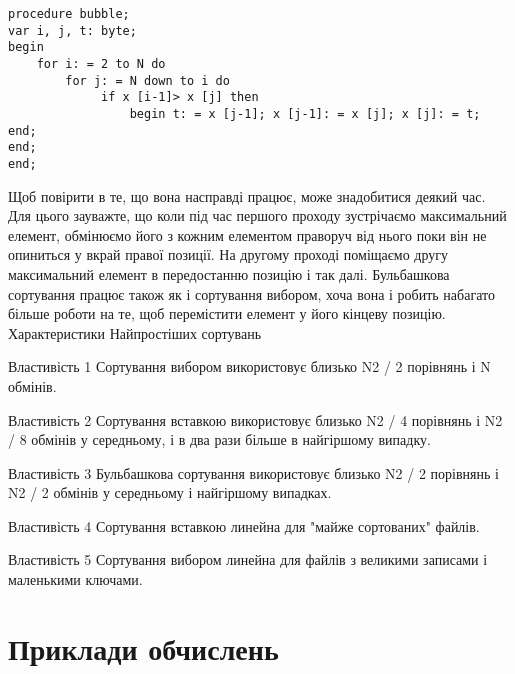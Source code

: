 \begin{lstlisting}[label=code:bubble,caption=Бульбашкове сортування]
procedure bubble;
var i, j, t: byte;
begin
    for i: = 2 to N do
        for j: = N down to i do
             if x [i-1]> x [j] then
                 begin t: = x [j-1]; x [j-1]: = x [j]; x [j]: = t; end;
end;
end;
\end{lstlisting}

Щоб повірити в те, що вона насправді працює, може знадобитися деякий час. Для цього зауважте, що коли під час першого проходу зустрічаємо максимальний елемент, обмінюємо його з кожним елементом праворуч від нього поки він не опиниться у вкрай правої позиції. На другому проході поміщаємо другу максимальний елемент в передостанню позицію і так далі. Бульбашкова сортування працює також як і сортування вибором, хоча вона і робить набагато більше роботи на те, щоб перемістити елемент у його кінцеву позицію.
Характеристики Найпростіших сортувань

Властивість 1 Сортування вибором використовує близько N2 / 2 порівнянь і N обмінів.

Властивість 2 Сортування вставкою використовує близько N2 / 4 порівнянь і N2 / 8 обмінів у середньому, і в два рази більше в найгіршому випадку.

Властивість 3 Бульбашкова сортування використовує близько N2 / 2 порівнянь і N2 / 2 обмінів у середньому і найгіршому випадках.

Властивість 4 Сортування вставкою линейна для "майже сортованих" файлів.

Властивість 5 Сортування вибором линейна для файлів з великими записами і маленькими ключами.


\section{Приклади обчислень}
\nopagebreak[4]




